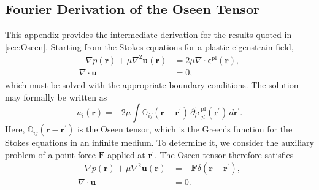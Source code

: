 \documentclass[asymmetricmargins]{library/duthesis}%
\begin{document}
\newpage
\begin{subappendices}
\section{Fourier Derivation of the Oseen Tensor}
\label{app:OseenDerivation}

This appendix provides the intermediate derivation for the results quoted in \cref{sec:Oseen}. Starting from the Stokes equations for a plastic eigenstrain field,
\begin{subequations}
\label{eq:AppStokes}
\begin{align}
- \nabla p(\bm{r}) + \mu \nabla^2 \bm{u}(\bm{r}) &= 2\mu \nabla \cdot \bm{\epsilon}^{\mathrm{pl}}(\bm{r}), \\
\nabla \cdot \bm{u} &= 0,
\end{align}
\end{subequations}
which must be solved with the appropriate boundary conditions. The solution may formally be written as
\begin{equation}
    u_i(\bm{r}) = -2\mu \int \mathbb{O}_{ij}(\bm{r}-\bm{r}^\prime)\,\partial_l^\prime \epsilon_{jl}^{\mathrm{pl}}(\bm{r}^\prime)\, d\bm{r}^\prime.
\end{equation}
Here, $\mathbb{O}_{ij}(\bm{r}-\bm{r}^\prime)$ is the Oseen tensor, which is the Green's function for the Stokes equations in an infinite medium. To determine it, we consider the auxiliary problem of a point force $\bm{F}$ applied at $\bm{r}^\prime$. The Oseen tensor therefore satisfies
\begin{subequations}
\label{eq:AppStokesPointForce}
\begin{align}
- \nabla p(\bm{r}) + \mu \nabla^2 \bm{u}(\bm{r}) &= -\bm{F} \delta(\bm{r} - \bm{r}^\prime), \label{eq:AppStokesPointForce1} \\
\nabla \cdot \bm{u} &= 0. \label{eq:AppStokesPointForce2}
\end{align}
\end{subequations}


\end{subappendices}
\end{document}
